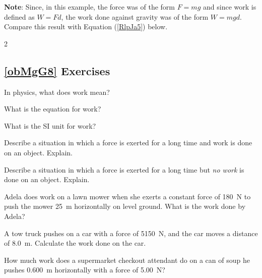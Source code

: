 \documentclass{article}
\numberwithin{equation}{section}
\numberwithin{figure}{section}
\begin{document}
\textbf{Note}: Since, in this example, the force was of the form $F = mg$ and since work is defined as $W = F d$, the work done against gravity was of the form $W = mgd$. Compare this result with Equation (\ref{RlpJa5}) below.

\cyanhrule

\begin{multicols}{2}

\subsection*{\ref{obMgG8} Exercises}

\begin{exercise} \label{S3zmkv}
    In physics, what does work mean?
\end{exercise}

\begin{exercise}
    What is the equation for work?
\end{exercise}

\begin{exercise}
    What is the SI unit for work?
\end{exercise}

\begin{exercise}
    Describe a situation in which a force is exerted for a long time and work is done on an object. Explain.
\end{exercise}

\begin{exercise} \label{g5xjKT}
    Describe a situation in which a force is exerted for a long time but \textit{no work} is done on an object. Explain.
\end{exercise}

\begin{exercise} \label{Xh4gxC}
    Adela does work on a lawn mower when she exerts a constant force of \SI{180}{N} to push the mower \SI{25}{m} horizontally on level ground. What is the work done by Adela?
\end{exercise}

\begin{exercise} \label{ZGiBxy}
A tow truck pushes on a car with a force of \SI{5150}{N}, and the car moves a distance of \SI{8.0}{m}. Calculate the work done on the car.
\end{exercise}

\begin{exercise} \label{MTcEJo}
    How much work does a supermarket checkout attendant do on a can of soup he pushes \SI{0.600}{m} horizontally with a force of \SI{5.00}{N}?
\end{exercise}


\end{multicols}
\end{document}
